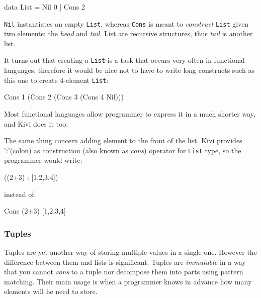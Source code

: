 \documentclass[12pt,a4paper]{report}
\begin{document}
\vspace*{0.2in}
\begin{code}[style=haskell]
data List = Nil 0 | Cons 2
\end{code}

\texttt{Nil} instantiates an empty \texttt{List}, whereas \texttt{Cons} is
meant to \textit{construct} \texttt{List} given two elements: the \textit{head}
and \textit{tail}. List are recursive structures, thus \textit{tail} is another
list.

It turns out that creating a \texttt{List} is a task that occurs very often in
functional languages, therefore it would be nice not to have to write long
constructs such as this one to create 4-element \texttt{List}:

\vspace*{0.2in}
\begin{code}[style=haskell]
Cons 1 (Cons 2 (Cons 3 (Cons 4 Nil)))
\end{code}

Most functional languages allow programmer to express it in a much shorter way,
and Kivi does it too:

\vspace*{0.2in}
\begin{code}[style=haskell]
[1, 2, 3, 4]
\end{code}

The same thing concern adding element to the front of the list. Kivi provides
':'(colon) as construction (also known as \textit{cons}) operator for
\texttt{List} type, so the programmer would write:

\vspace*{0.2in}
\begin{code}[style=haskell]
((2+3) : [1,2,3,4])
\end{code}

instead of:

\vspace*{0.2in}
\begin{code}[style=haskell]
Cons (2+3)  [1,2,3,4]
\end{code}

\subsubsection{Tuples}
Tuples are yet another way of storing multiple values in a single one. However
the difference between them and lists is significant. Tuples are
\textit{immutable} in a way that you cannot \textit{cons} to a tuple nor
decompose them into parts using pattern matching. Their main usage is when a
programmer knows in advance how many elements will he need to store.
\end{document}
